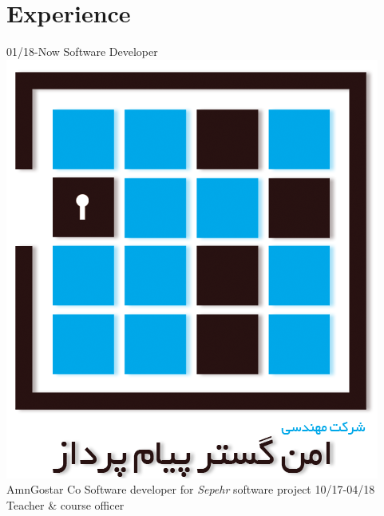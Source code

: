 \documentclass[a4paper]{friggeri-cv}
\begin{document}
\section{Experience}
\begin{entrylist}
  \entry
    {01/18-Now}
    {    Software Developer}
    {\includegraphics[scale=0.04]{img/AmnGostar_logo.png} AmnGostar Co}
    {Software developer for \emph{Sepehr} software project}
  \entry
    {10/17-04/18}
    {    Teacher \& course officer}

\end{entrylist}
\end{document}

